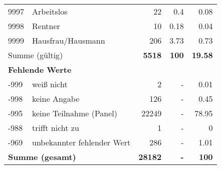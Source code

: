 \begin{longtable}{lXrrr}
        9997 & \multicolumn{1}{X}{Arbeitslos} & %
          \num{22} &
          \num[round-mode=places,round-precision=2]{0.4} &
          \num[round-mode=places,round-precision=2]{0.08} \\

        9998 & \multicolumn{1}{X}{Rentner} & %
          \num{10} &
          \num[round-mode=places,round-precision=2]{0.18} &
          \num[round-mode=places,round-precision=2]{0.04} \\

        9999 & \multicolumn{1}{X}{Hausfrau/Hausmann} & %
          \num{206} &
          \num[round-mode=places,round-precision=2]{3.73} &
          \num[round-mode=places,round-precision=2]{0.73} \\

     \midrule
     \multicolumn{2}{l}{Summe (gültig)} &
       \textbf{\num{5518}} &
     \textbf{\num{100}} &
       \textbf{\num[round-mode=places,round-precision=2]{19.58}} \\
     \multicolumn{5}{l}{\textbf{Fehlende Werte}}\\
       -999 &
       weiß nicht &
         \num{2} &
        - &
         \num[round-mode=places,round-precision=2]{0.01} \\
       -998 &
       keine Angabe &
         \num{126} &
        - &
         \num[round-mode=places,round-precision=2]{0.45} \\
       -995 &
       keine Teilnahme (Panel) &
         \num{22249} &
        - &
         \num[round-mode=places,round-precision=2]{78.95} \\
       -988 &
       trifft nicht zu &
         \num{1} &
        - &
         \num[round-mode=places,round-precision=2]{0} \\
       -969 &
       unbekannter fehlender Wert &
         \num{286} &
        - &
         \num[round-mode=places,round-precision=2]{1.01} \\
     \midrule
     \multicolumn{2}{l}{\textbf{Summe (gesamt)}} &
          \textbf{\num{28182}} &
        \textbf{-} &
        \textbf{\num{100}} \\
     \bottomrule
     \end{longtable}
     
